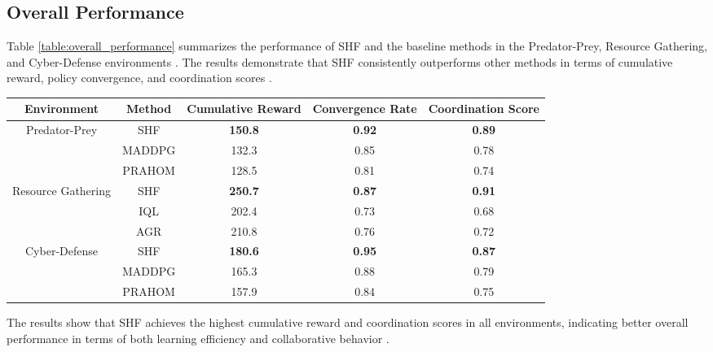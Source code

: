 \documentclass[sigconf,anonymous]{aamas}
\begin{document}
\subsection{Overall Performance}
Table \ref{table:overall_performance} summarizes the performance of SHF and the baseline methods in the Predator-Prey, Resource Gathering, and Cyber-Defense environments \cite{foerster2016learning}. The results demonstrate that SHF consistently outperforms other methods in terms of cumulative reward, policy convergence, and coordination scores \cite{foerster2018counterfactual}.

\begin{table*}[ht]
\centering
\caption{Performance comparison of SHF and baseline methods across different environments.}
\label{table:overall_performance}
\begin{tabular}{|c|c|c|c|c|}
\hline
\textbf{Environment} & \textbf{Method} & \textbf{Cumulative Reward} & \textbf{Convergence Rate} & \textbf{Coordination Score} \\ \hline
\multirow{3}{*}{Predator-Prey} & SHF & \textbf{150.8} & \textbf{0.92} & \textbf{0.89} \\ \cline{2-5} 
                               & MADDPG & 132.3 & 0.85 & 0.78 \\ \cline{2-5} 
                               & PRAHOM & 128.5 & 0.81 & 0.74 \\ \hline
\multirow{3}{*}{Resource Gathering} & SHF & \textbf{250.7} & \textbf{0.87} & \textbf{0.91} \\ \cline{2-5} 
                                    & IQL & 202.4 & 0.73 & 0.68 \\ \cline{2-5} 
                                    & AGR & 210.8 & 0.76 & 0.72 \\ \hline
\multirow{3}{*}{Cyber-Defense} & SHF & \textbf{180.6} & \textbf{0.95} & \textbf{0.87} \\ \cline{2-5} 
                               & MADDPG & 165.3 & 0.88 & 0.79 \\ \cline{2-5} 
                               & PRAHOM & 157.9 & 0.84 & 0.75 \\ \hline
\end{tabular}
\end{table*}

The results show that SHF achieves the highest cumulative reward and coordination scores in all environments, indicating better overall performance in terms of both learning efficiency and collaborative behavior \cite{foerster2018counterfactual, wei2019safe}.
\end{document}
